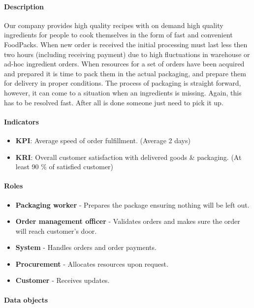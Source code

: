 \documentclass[11pt,a4paper]{article}
\begin{document}
\paragraph{Description}
Our company provides high quality recipes with on demand high quality ingredients for people to cook themselves in the form of fast and convenient FoodPacks. When new order is received the initial processing must last less then two hours (including receiving payment) due to high fluctuations in warehouse or ad-hoc ingredient orders. When resources for a set of orders have been acquired and prepared it is time to pack them in the actual packaging, and prepare them for delivery in proper conditions. The process of packaging is straight forward, however, it can come to a situation when an ingredients is missing. Again, this has to be resolved fast. After all is done someone just need to pick it up.

\paragraph{Indicators}

\begin{itemize}
    \item \textbf{KPI}: Average speed of order fulfillment. (Average 2 days)
    \item \textbf{KRI}: Overall customer satisfaction with delivered goods \& packaging. (At least 90 \% of satisfied customer)
\end{itemize}

\paragraph{Roles}

\begin{itemize}
    \item \textbf{Packaging worker} - Prepares the package ensuring nothing will be left out.
    \item \textbf{Order management officer} - Validates orders and makes sure the order will reach customer's door.
    \item \textbf{System} - Handles orders and order payments.
    \item \textbf{Procurement} - Allocates resources upon request.
    \item \textbf{Customer} - Receives updates.
\end{itemize}

\paragraph{Data objects}
\end{document}
